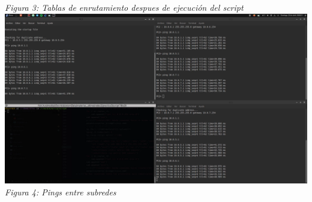 \documentclass[10pt]{article}
\begin{document}
\begin{center}
  \textit{Figura 3: Tablas de enrutamiento despues de ejecución del script}
  \\
  \includegraphics[scale=0.25]{imgs/4.png}\\
  \textit{Figura 4: Pings entre subredes}
\end{center}
\end{document}
